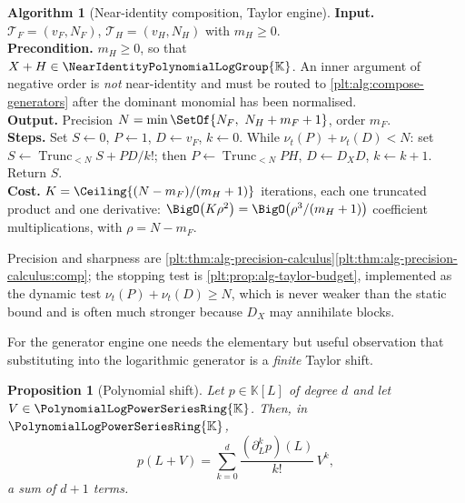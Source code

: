 \documentclass[11pt,oneside]{article}
\theoremstyle{plain}
\newtheorem{proposition}[theorem]{Proposition}
\theoremstyle{definition}
\newtheorem{algorithm}[theorem]{Algorithm}
\theoremstyle{remark}
\newcommand{\K}{\mathbb{K}}
\newcommand{\PLpow}{\PolynomialLogPowerSeriesRing{\K}}   %
\newcommand{\Gnear}{\NearIdentityPolynomialLogGroup{\K}} %
\newcommand{\ordt}{\nu_{t}}                              %
\newcommand{\Trunc}[2]{\operatorname{Trunc}_{<#2}#1}     %
\newcommand{\DX}{D_{X}}                                  %
\begin{document}

\begin{algorithm}[Near-identity composition, Taylor engine]
\label{plt:alg:compose-taylor}
\textbf{Input.}  \(\mathcal T_F=(v_F,N_F)\), \(\mathcal T_H=(v_H,N_H)\) with
\(m_H\ge0\).\\
\textbf{Precondition.}  \(m_H\ge0\), so that \(X+H\in\Gnear\).  An inner
argument of negative order is \emph{not} near-identity and must be routed to
\cref{plt:alg:compose-generators} after the dominant monomial has been
normalised.\\
\textbf{Output.}  Precision \(N=\min\SetOf{N_F,\ N_H+m_F+1}\), order \(m_F\).\\
\textbf{Steps.}  Set \(S\leftarrow0\), \(P\leftarrow1\), \(D\leftarrow v_F\),
\(k\leftarrow0\).  While \(\ordt(P)+\ordt(D)<N\): set
\(S\leftarrow\Trunc{S+PD/k!}{N}\); then \(P\leftarrow\Trunc{PH}{N}\),
\(D\leftarrow\DX D\), \(k\leftarrow k+1\).  Return \(S\).\\
\textbf{Cost.}  \(K=\Ceiling{(N-m_F)/(m_H+1)}\) iterations, each one truncated
product and one derivative:
\(\BigO\bigl(K\rho^2\bigr)=\BigO\bigl(\rho^3/(m_H+1)\bigr)\) coefficient
multiplications, with \(\rho=N-m_F\).
\end{algorithm}

Precision and sharpness are
\cref{plt:thm:alg-precision-calculus}\ref{plt:thm:alg-precision-calculus:comp};
the stopping test is \cref{plt:prop:alg-taylor-budget}, implemented as the
dynamic test \(\ordt(P)+\ordt(D)\ge N\), which is never weaker than the static
bound and is often much stronger because \(\DX\) may annihilate blocks.

For the generator engine one needs the elementary but useful observation that
substituting into the logarithmic generator is a \emph{finite} Taylor shift.

\begin{proposition}[Polynomial shift]\label{plt:prop:alg-shift}
Let \(p\in\K[L]\) of degree \(d\) and let \(V\in\PLpow\).  Then, in \(\PLpow\),
\begin{equation}\label{plt:eq:alg-shift}
 p(L+V)=\sum_{k=0}^{d}\frac{(\partial_L^kp)(L)}{k!}\,V^k,
\end{equation}
a sum of \(d+1\) terms.
\end{proposition}
\end{document}
